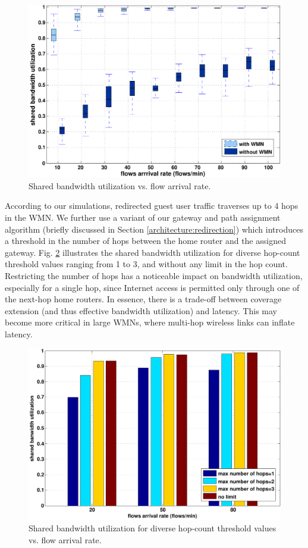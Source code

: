 \begin{figure}[t]
\begin{center}
\includegraphics[width=1\linewidth]{results/boxplot2.pdf}
\caption{Shared bandwidth utilization vs. flow arrival rate.}
\label{fig:utilization_arrival}
\end{center}
\end{figure}

According to our simulations, redirected guest user traffic traverses up to 4 hops in the WMN. We further use a variant of our gateway and path assignment algorithm (briefly discussed in Section \ref{architecture:redirection}) which introduces a threshold in the number of hops between the home router and the assigned gateway. Fig. \ref{fig:hop_count} illustrates the shared bandwidth utilization for diverse hop-count threshold values ranging from 1 to 3, and without any limit in the hop count. Restricting the number of hops has a noticeable impact on bandwidth utilization, especially for a single hop, since Internet access is permitted only through one of the next-hop home routers. In essence, there is a trade-off between coverage extension (and thus effective bandwidth utilization) and latency. This may become more critical in large WMNs, where multi-hop wireless links can inflate latency.


\begin{figure}[t]
\begin{center}
\includegraphics[width=1\linewidth]{results/hops_vs_BW.pdf}
\caption{Shared bandwidth utilization for diverse hop-count threshold values vs. flow arrival rate.}
\label{fig:hop_count}
\end{center}
\end{figure}

